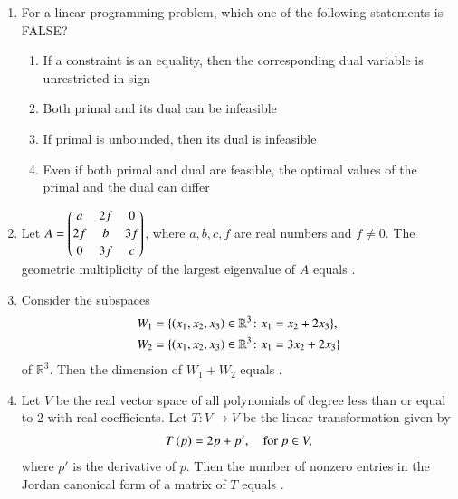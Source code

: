 \documentclass[journal,12pt,onecolumn]{IEEEtran}
\theoremstyle{remark}
\begin{document}
\begin{enumerate}[start=10]
\hfill{}
\begin{enumerate}
\end{enumerate}

\item For a linear programming problem, which one of the following statements is FALSE? \\ 
\begin{enumerate}
\item If a constraint is an equality, then the corresponding dual variable is unrestricted in sign
\item Both primal and its dual can be infeasible
\item If primal is unbounded, then its dual is infeasible
\item Even if both primal and dual are feasible, the optimal values of the primal and the dual can differ
\end{enumerate}

\item Let $A =
\begin{pmatrix} a & 2f & 0 \\[2pt] 2f & b & 3f \\[2pt] 0 & 3f & c \end{pmatrix}$, where $a, b, c, f$ are real numbers and $f \ne 0$. The geometric multiplicity of the largest eigenvalue of $A$ equals \underline{\hspace{2cm}}.

\hfill{}

\item Consider the subspaces
\begin{align*}
W_1 &= \{\left(x_1, x_2, x_3\right) \in \mathbb{R}^3 \colon x_1 = x_2 + 2x_3\},\\
W_2 &= \{\left(x_1, x_2, x_3\right) \in \mathbb{R}^3 \colon x_1 = 3x_2 + 2x_3\}
\end{align*}
of $\mathbb{R}^3$. Then the dimension of $W_1 + W_2$ equals \underline{\hspace{2cm}}. 

\hfill{}
\newpage
\item Let $V$ be the real vector space of all polynomials of degree less than or equal to $2$ with real
coefficients. Let $T \colon V \to V$ be the linear transformation given by
\begin{align*}
T\left(p\right) = 2p+ p',\quad \text{for } p \in V,
\end{align*}
where $p'$ is the derivative of $p$. Then the number of nonzero entries in the Jordan canonical
form of a matrix of $T$ equals \underline{\hspace{2cm}}. 
\hfill{}


\end{enumerate}
\end{document}
